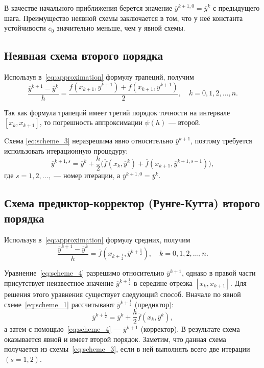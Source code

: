 В качестве начального приближения берется значение
\( \overline{y}^{k+1, 0} = \overline{y}^k \) с предыдущего шага.
Преимущество неявной схемы заключается в том, что у неё константа устойчивости
\( c_0 \) значительно меньше, чем у явной схемы.

\subsection{Неявная схема второго порядка}

Используя в~\eqref{eq:approximation} формулу трапеций, получим
\begin{equation}
  \dfrac{\overline{y}^{k+1} - \overline{y}^k}{h} =
  \dfrac{
    \overline{f}(x_{k+1}, \overline{y}^{k+1}) +
    \overline{f}(x_{k+1}, \overline{y}^{k+1})}{
    2
  }, \quad
  k = 0, 1, 2, \ldots, n.
  \label{eq:scheme_3}
\end{equation}

Так как формула трапеций имеет третий порядок точности на интервале
\( [x_k, x_{k+1}] \), то погрешность аппроксимации \( \psi(h) \) --- второй.

Cхема \eqref{eq:scheme_3} неразрешима явно относительно \( \overline{y}^{k+1} \),
поэтому требуется использовать итерационную процедуру:
\begin{equation}
  \overline{y}^{k+1, s} = \overline{y}^k +
  \dfrac{h}{2} \bigg(
  \overline{f}(x_k, \overline{y}^k) +
  \overline{f}(x_{k+1}, \overline{y}^{k+1, s-1})
  \bigg),
\end{equation}
где \( s = 1, 2, \ldots, \) --- номер итерации, а
\( \overline{y}^{k+1, 0} = \overline{y}^k \).

\subsection{Схема предиктор-корректор (Рунге-Кутта) второго порядка}

Используя в~\eqref{eq:approximation} формулу средних, получим
\begin{equation}
  \dfrac{\overline{y}^{k+1} - \overline{y}^k}{h} =
  \overline{f}(x_{k+\frac{1}{2}}, \overline{y}^{k+\frac{1}{2}}), \quad
  k = 0, 1, 2, \ldots, n.
  \label{eq:scheme_4}
\end{equation}

Уравнение~\eqref{eq:scheme_4} разрешимо относительно \( \overline{y}^{k+1} \),
однако в правой части присутствует неизвестное значение
\( \overline{y}^{k+\frac{1}{2}} \) в середине отрезка \( [x_k, x_{k+1}] \).
Для решения этого уравнения существует следующий способ.
Вначале по явной схеме~\eqref{eq:scheme_1} рассчитывают
\( \overline{y}^{k+\frac{1}{2}} \) (предиктор):
\begin{equation*}
  \overline{y}^{k+\frac{1}{2}} = \overline{y}^{k} +
  \dfrac{h}{2} \overline{f}(x_k, \overline{y}^k),
\end{equation*}
а затем с помощью~\eqref{eq:scheme_4} ---
\( \overline{y}^{k+1} \) (корректор).
В результате схема оказывается явной и имеет второй порядок.
Заметим, что данная схема получается из схемы~\eqref{eq:scheme_3},
если в ней выполнять всего две итерации \( (s = 1, 2) \).


